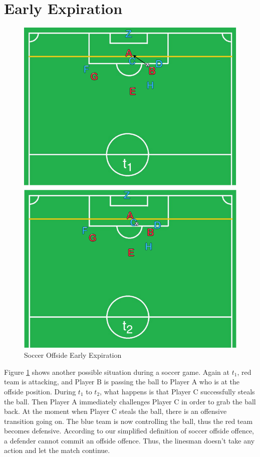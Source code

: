 \section{Early Expiration}

\begin{figure}[!htbp]
	\centering
	\includegraphics[width=5in]{img/1-seex.pdf}
	\caption{Soccer Offside Early Expiration}
	\label{fig:1-seex} 
\end{figure}

Figure \ref{fig:1-seex} shows another possible situation during a soccer game. 
Again at $t_{1}$, red team is attacking, and Player B is passing the ball to Player A who is at the offside position.
During $t_{1}$ to $t_{2}$, what happens is that Player C successfully steals the ball.
Then Player A immediately challenges Player C in order to grab the ball back. 
At the moment when Player C steals the ball, there is an offensive transition going on.
The blue team is now controlling the ball, thus the red team becomes defensive. 
According to our simplified definition of soccer offside offence, a defender cannot commit an offside offence. 
Thus, the linesman doesn't take any action and let the match continue. 

